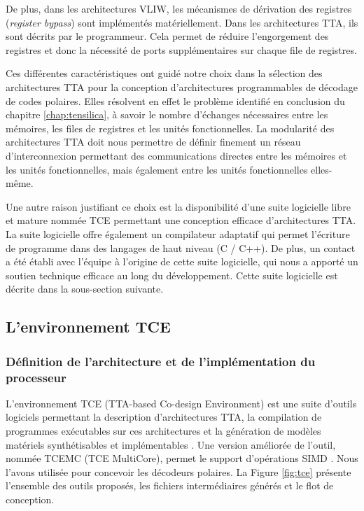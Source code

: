 De plus, dans les architectures VLIW, les mécanismes de dérivation des registres (\textit{register bypass}) sont implémentés matériellement. Dans les architectures TTA, ils sont décrits par le programmeur. Cela permet de réduire l'engorgement des registres et donc la nécessité de ports supplémentaires sur chaque file de registres.

Ces différentes caractéristiques ont guidé notre choix dans la sélection des architectures TTA pour la conception d'architectures programmables de décodage de codes polaires. Elles résolvent en effet le problème identifié en conclusion du chapitre \ref{chap:tensilica}, à savoir le nombre d'échanges nécessaires entre les mémoires, les files de registres et les unités fonctionnelles. La modularité des architectures TTA doit nous permettre de définir finement un réseau d'interconnexion permettant des communications directes entre les mémoires et les unités fonctionnelles, mais également entre les unités fonctionnelles elles-même.

Une autre raison justifiant ce choix est la disponibilité d'une suite logicielle libre et mature nommée TCE permettant une conception efficace d'architectures TTA. La suite logicielle offre également un compilateur adaptatif qui permet l'écriture de programme dans des langages de haut niveau (C / C++). De plus, un contact a été établi avec l'équipe à l'origine de cette suite logicielle, qui nous a apporté un soutien technique efficace au long du développement. Cette suite logicielle est décrite dans la sous-section suivante.


\subsection{L'environnement TCE}

\subsubsection{Définition de l'architecture et de l'implémentation du processeur}

L'environnement TCE (TTA-based Co-design Environment) est une suite d'outils logiciels permettant la description d'architectures TTA, la compilation de programmes exécutables sur ces architectures et la génération de modèles matériels synthétisables et implémentables \cite{jaaskelainen_hw/sw_2017}. Une version améliorée de l'outil, nommée TCEMC (TCE MultiCore), permet le support d'opérations SIMD \cite{tcemc_2011}. Nous l'avons utilisée pour concevoir les décodeurs polaires. La Figure \ref{fig:tce} présente l'ensemble des outils proposés, les fichiers intermédiaires générés et le flot de conception.

